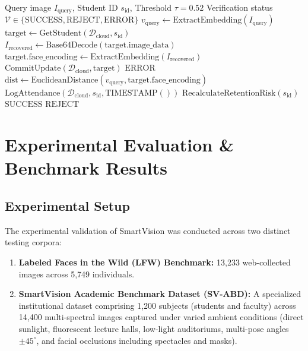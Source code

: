 \documentclass[conference]{IEEEtran}
\begin{document}
\begin{algorithm}[htbp]
\caption{Self-Healing Biometric Vector Sync \& Matching}
\label{alg:selfhealing}
\begin{algorithmic}[1]
\REQUIRE Query image $I_{\text{query}}$, Student ID $s_{\text{id}}$, Threshold $\tau = 0.52$
\ENSURE Verification status $\mathcal{V} \in \{\text{SUCCESS}, \text{REJECT}, \text{ERROR}\}$
\STATE $v_{\text{query}} \leftarrow \text{ExtractEmbedding}(I_{\text{query}})$
\STATE $\text{target} \leftarrow \text{GetStudent}(\mathcal{D}_{\text{cloud}}, s_{\text{id}})$
        \STATE $I_{\text{recovered}} \leftarrow \text{Base64Decode}(\text{target.image\_data})$
        \STATE $\text{target.face\_encoding} \leftarrow \text{ExtractEmbedding}(I_{\text{recovered}})$
        \STATE $\text{CommitUpdate}(\mathcal{D}_{\text{cloud}}, \text{target})$
    \ELSE
        \RETURN $\text{ERROR}$
    \ENDIF
\ENDIF
\STATE $\text{dist} \leftarrow \text{EuclideanDistance}(v_{\text{query}}, \text{target.face\_encoding})$
    \STATE $\text{LogAttendance}(\mathcal{D}_{\text{cloud}}, s_{\text{id}}, \text{TIMESTAMP}())$
    \STATE $\text{RecalculateRetentionRisk}(s_{\text{id}})$
    \RETURN $\text{SUCCESS}$
\ELSE
    \RETURN $\text{REJECT}$
\ENDIF
\end{algorithmic}
\end{algorithm}

\section{Experimental Evaluation \& Benchmark Results}

\subsection{Experimental Setup}
The experimental validation of SmartVision was conducted across two distinct testing corpora:
\begin{enumerate}
    \item \textbf{Labeled Faces in the Wild (LFW) Benchmark:} 13,233 web-collected images across 5,749 individuals.
    \item \textbf{SmartVision Academic Benchmark Dataset (SV-ABD):} A specialized institutional dataset comprising 1,200 subjects (students and faculty) across 14,400 multi-spectral images captured under varied ambient conditions (direct sunlight, fluorescent lecture halls, low-light auditoriums, multi-pose angles $\pm 45^\circ$, and facial occlusions including spectacles and masks).
\end{enumerate}
\end{document}
